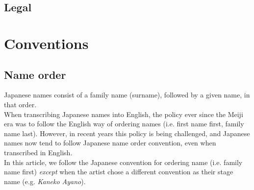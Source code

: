 \subsection{Legal}



\bigskip
\bigskip

\section{Conventions}

\subsection{Name order}

Japanese names consist of a family name (surname), followed by a given name, in that order. \\

When transcribing Japanese names into English, the policy ever since the Meiji era was to follow the English way of ordering names (i.e. first name first, family name last). However, in recent years this policy is being challenged, and Japanese names now tend to follow Japanese name order convention, even when transcribed in English. \\

In this article, we follow the Japanese convention for ordering name (i.e. family name first) \emph{except} when the artist chose a different convention as their stage name (e.g. \emph{Kaneko Ayano}). \\


